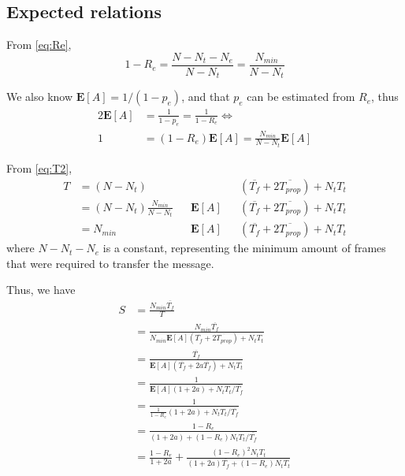 \documentclass[a4paper, 11pt]{report}
\newcommand\expected[1]{\mathbf{E}[#1]}
\begin{document}
\subsection{Expected relations}

From \ref{eq:Re},
\begin{equation}
	1-R_e = \frac{N - N_t - N_e}{N-N_t} = \frac{N_{min}}{N-N_t}
\end{equation}

We also know $\expected{A} = 1/(1-p_e)$, and that $p_e$ can be estimated from $R_e$, thus
\begin{alignat}{2}
	\expected{A} &= \frac{1}{1-p_e} = \frac{1}{1-R_e} \iff \\
	1 &= (1-R_e)\expected{A} = \frac{N_{min}}{N-N_t}\expected{A}
\end{alignat}

From \ref{eq:T2},
\begin{equation}
	\begin{alignedat}{5}
		T
		& = (N-N_t)                       &&              && (\overline{T_f} + 2\overline{T_{prop}}) + N_t T_t \\
		& = (N-N_t) \frac{N_{min}}{N-N_t} && \expected{A} && (\overline{T_f} + 2\overline{T_{prop}}) + N_t T_t \\
		& = N_{min}                       && \expected{A} && (\overline{T_f} + 2\overline{T_{prop}}) + N_t T_t
	\end{alignedat}
\end{equation}
where $N-N_t-N_e$ is a constant, representing the minimum amount of frames that were required to transfer the message.

Thus, we have
\begin{equation} \label{eq:S_rel}
\begin{alignedat}{2}
	S
	&= \frac{N_{min}\overline{T_f}}{T} \\
	&= \frac{N_{min}\overline{T_f}}{N_{min} \expected{A}(\overline{T_f} + 2\overline{T_{prop}}) + N_t T_t} \\
	&= \frac{\overline{T_f}}{\expected{A}(\overline{T_f} + 2a\overline{T_f}) + N_t T_t} \\
	&= \frac{1}{\expected{A}(1 + 2a) + N_t T_t / \overline{T_f}} \\
	&= \frac{1}{\frac{1}{1-R_e}(1 + 2a) + N_t T_t / \overline{T_f}} \\
	&= \frac{1-R_e}{(1 + 2a) + (1-R_e) N_t T_t / \overline{T_f}} \\
	&= \frac{1-R_e}{1 + 2a} + \frac{(1-R_e)^2 N_t T_t}{(1 + 2a)\overline{T_f} + (1-R_e) N_t T_t}
\end{alignedat}
\end{equation}
\end{document}
